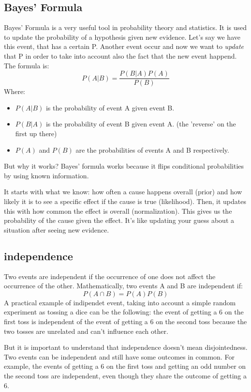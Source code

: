 \documentclass[a4paper]{article}
\begin{document}
\subsection{Bayes' Formula}
Bayes' Formula is a very useful tool in probability theory and statistics. It is used to update the probability of a hypothesis given new evidence. Let's say we have this event, that has a certain P. Another event occur and now we want to \textit{update} that P in order to take into account also the fact that the new event happend. The formula is:
\[ P(A|B) = \frac{P(B|A)P(A)}{P(B)} \]
Where: \begin{itemize}
    \item \( P(A|B) \) is the probability of event A given event B.
    \item \( P(B|A) \) is the probability of event B given event A. (the 'reverse' on the first up there)
    \item \( P(A) \) and \( P(B) \) are the probabilities of events A and B respectively.
\end{itemize}
But why it works? Bayes’ formula works because it flips conditional probabilities by using known information. 

It starts with what we know: how often a cause happens overall (prior) and how likely it is to see a specific effect if the cause is true (likelihood). Then, it updates this with how common the effect is overall (normalization). This gives us the probability of the cause given the effect. It’s like updating your guess about a situation after seeing new evidence.

\subsection{independence}
Two events are independent if the occurrence of one does not affect the occurrence of the other. Mathematically, two events A and B are independent if:
\[ P(A \cap B) = P(A)P(B) \]
A practical example of indipendet event, taking into account a simple random experiment as tossing a dice can be the following: the event of getting a 6 on the first toss is independent of the event of getting a 6 on the second toss because the two tosses are unrelated and can't influence each other.

But it is important to understand that independence doesn't mean disjointedness. Two events can be independent and still have some outcomes in common. For example, the events of getting a 6 on the first toss and getting an odd number on the second toss are independent, even though they share the outcome of getting a 6.
\end{document}
